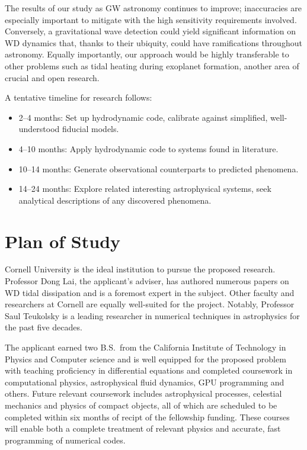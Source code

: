 \documentclass[12pt,
        usenames, %
        dvipsnames %
    ]{article}
\begin{document}
The results of our study as GW astronomy continues to improve; inaccuracies are
especially important to mitigate with the high sensitivity requirements
involved. Conversely, a gravitational wave detection could yield significant
information on WD dynamics that, thanks to their ubiquity, could have
ramifications throughout astronomy. Equally importantly, our approach would be
highly transferable to other problems such as tidal heating during exoplanet
formation, another area of crucial and open research.

A tentative timeline for research follows:
\begin{itemize}
    \item 2--4 months: Set up hydrodynamic code, calibrate against simplified,
        well-understood fiducial models.
    \item 4--10 months: Apply hydrodynamic code to systems found in literature.
    \item 10--14 months: Generate observational counterparts to predicted
        phenomena.
    \item 14--24 months: Explore related interesting astrophysical systems, seek
        analytical descriptions of any discovered phenomena.
\end{itemize}

\section{Plan of Study}\label{s:plan}

Cornell University is the ideal institution to pursue the proposed research.
Professor Dong Lai, the applicant's adviser, has authored numerous papers on WD
tidal dissipation and is a foremost expert in the subject. Other faculty and
researchers at Cornell are equally well-suited for the project. Notably,
Professor Saul Teukolsky is a leading researcher in numerical techniques in
astrophysics for the past five decades.

The applicant earned two B.S.\ from the California Institute of Technology in
Physics and Computer science and is well equipped for the proposed problem with
teaching proficiency in differential equations and completed coursework in
computational physics, astrophysical fluid dynamics, GPU programming and others.
Future relevant coursework includes astrophysical processes, celestial
mechanics and physics of compact objects, all of which are scheduled to be
completed within six months of recipt of the fellowship funding. These courses
will enable both a complete treatment of relevant physics and accurate, fast
programming of numerical codes.
\end{document}

